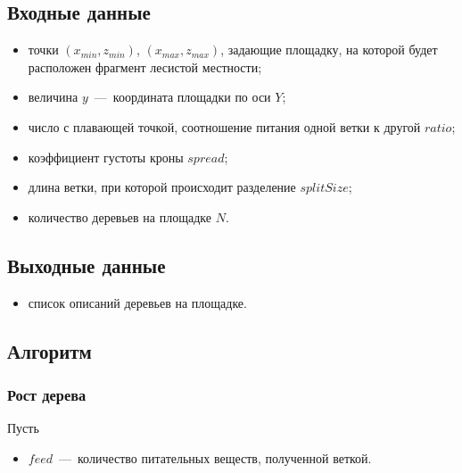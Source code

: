 \subsection{Входные данные}
\begin{itemize}
\item точки $(x_{min}, z_{min})$, $(x_{max}, z_{max})$, задающие площадку, на которой будет расположен фрагмент лесистой местности;
\item величина $y$~---~координата площадки по оси $Y$;
\item число с плавающей точкой, соотношение питания одной ветки к другой $ratio$;
\item коэффициент густоты кроны $spread$;
\item длина ветки, при которой происходит разделение $splitSize$;
\item количество деревьев на площадке $N$.
\end{itemize}


\subsection{Выходные данные}
\begin{itemize}
\item список описаний деревьев на площадке.
\end{itemize}


\subsection{Алгоритм}

\subsubsection{Рост дерева}
Пусть

\begin{itemize}
	\item $feed$~---~количество питательных веществ, полученной веткой.
\end{itemize}

